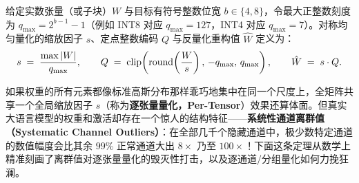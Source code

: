 \begin{defBox}
\begin{definition}
\label{def:sym-quant}
给定实数张量（或子块）$W$ 与目标有符号整数位宽 $b \in \{4, 8\}$，令最大正整数刻度为 $q_{\max} = 2^{b-1} - 1$（例如 INT8 对应 $q_{\max} = 127$，INT4 对应 $q_{\max} = 7$）。对称均匀量化的缩放因子 $s$、定点整数编码 $Q$ 与反量化重构值 $\hat{W}$ 定义为：
\begin{equation}
  s \;=\; \frac{\max |W|}{q_{\max}}, \qquad
  Q \;=\; \operatorname{clip}\!\left(\operatorname{round}\!\left(\frac{W}{s}\right),\, -q_{\max},\, q_{\max}\right), \qquad
  \hat{W} \;=\; s \cdot Q.
  \label{eq:sym-quant}
\end{equation}
\end{definition}
\end{defBox}

如果权重的所有元素都像标准高斯分布那样乖巧地集中在同一个尺度上，全矩阵共享一个全局缩放因子 $s$（称为\textbf{逐张量量化，Per-Tensor}）效果还算体面。但真实大语言模型的权重和激活却存在一个惊人的结构特征——\textbf{系统性通道离群值（Systematic Channel Outliers）}：在全部几千个隐藏通道中，极少数特定通道的数值幅度会比其余 $99\%$ 正常通道大出 $8\times$ 乃至 $100\times$！下面这条定理从数学上精准刻画了离群值对逐张量量化的毁灭性打击，以及逐通道/分组量化如何力挽狂澜。

